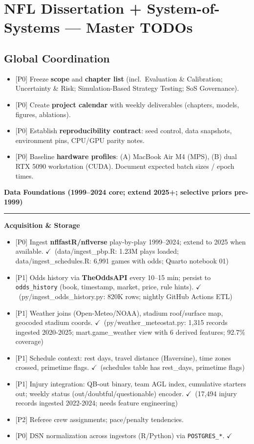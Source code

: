 \documentclass[11pt]{article}
\newcommand{\block}[1]{\par\noindent\textbf{#1}\par\vspace{0.25em}}
\newcommand{\milestone}[1]{\vspace{0.5em}\noindent\textbf{\large #1}\par\vspace{0.25em}\hrule\vspace{0.5em}}
\newcommand{\done}{\textcolor{green!60!black}{\(\checkmark\)}}
\newcommand{\prio}[1]{\textcolor{blue!70!black}{[#1]}}
\begin{document}
\section*{NFL Dissertation + System-of-Systems — Master TODOs}

\subsection*{Global Coordination}
\begin{itemize}
  \item \prio{P0} Freeze \textbf{scope} and \textbf{chapter list} (incl.\ Evaluation \& Calibration; Uncertainty \& Risk; Simulation-Based Strategy Testing; SoS Governance).
  \item \prio{P0} Create \textbf{project calendar} with weekly deliverables (chapters, models, figures, ablations).
  \item \prio{P0} Establish \textbf{reproducibility contract}: seed control, data snapshots, environment pins, CPU/GPU parity notes.
  \item \prio{P0} Baseline \textbf{hardware profiles}: (A) MacBook Air M4 (MPS), (B) dual RTX 5090 workstation (CUDA). Document expected batch sizes / epoch times.
\end{itemize}

\milestone{Data Foundations (1999–2024 core; extend 2025+; selective priors pre-1999)}
\block{Acquisition \& Storage}
\begin{itemize}
  \item \prio{P0} Ingest \textbf{nflfastR/nflverse} play-by-play 1999–2024; extend to 2025 when available. \done\ (data/ingest\_pbp.R: 1.23M plays loaded; data/ingest\_schedules.R: 6,991 games with odds; Quarto notebook 01)
  \item \prio{P1} Odds history via \textbf{TheOddsAPI} every 10–15 min; persist to \texttt{odds\_history} (book, timestamp, market, price, rule hints). \done\ (py/ingest\_odds\_history.py: 820K rows; nightly GitHub Actions ETL)
  \item \prio{P1} Weather joins (Open-Meteo/NOAA), stadium roof/surface map, geocoded stadium coords. \done\ (py/weather\_meteostat.py: 1,315 records ingested 2020-2025; mart.game\_weather view with 6 derived features; 92.7\% coverage)
  \item \prio{P1} Schedule context: rest days, travel distance (Haversine), time zones crossed, primetime flags. \done\ (schedules table has rest\_days, primetime flags)
  \item \prio{P1} Injury integration: QB-out binary, team AGL index, cumulative starters out; weekly status (out/doubtful/questionable) encoder. \done\ (17,494 injury records ingested 2022-2024; needs feature engineering)
  \item \prio{P2} Referee crew assignments; pace/penalty tendencies.
  \item \prio{P0} DSN normalization across ingestors (R/Python) via \texttt{POSTGRES\_*}. \done
\end{itemize}
\end{document}
